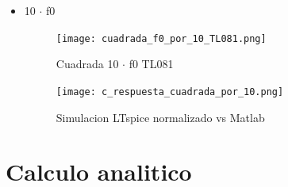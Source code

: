 \documentclass[11pt]{diazessay} %
\begin{document}
\begin{itemize}
\begin{itemize}
\newpage
\item 10 $\cdot$ f0
\begin{figure}[h]
\centering
	\texttt{[image: cuadrada\_f0\_por\_10\_TL081.png]}
\caption{Cuadrada 10 $\cdot$ f0 TL081}
\end{figure}

\newpage
\begin{figure}[h]
\centering
	\texttt{[image: c\_respuesta\_cuadrada\_por\_10.png]}
\caption{Simulacion LTspice normalizado vs Matlab}
\break
\end{figure}
\end{itemize}

\end{itemize}


\newpage
\section*{Calculo analitico}
\end{document}
